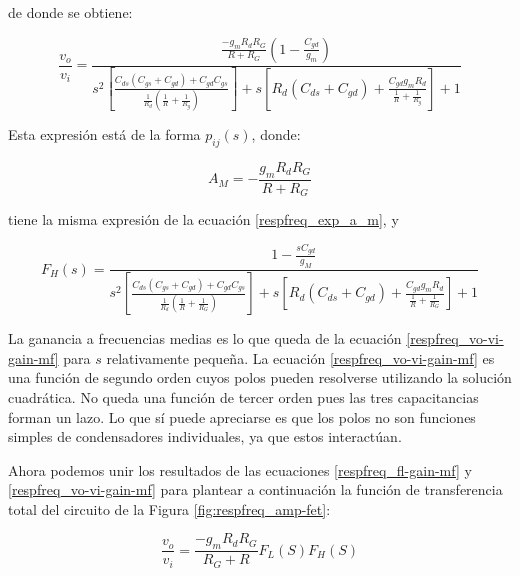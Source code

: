 de donde se obtiene:


\begin{equation} \label{respfreq_vo-vi-gain-mf}
	\frac{v_o}{v_i} = \frac{\frac{-g_m R_d R_G}{R+R_G} \left(1-\frac{C_{gd}}{g_m} \right) }{ s^2 \left[ \frac{C_{ds}\left(C_{gs}+C_{gd}\right)+C_{gd}C_{gs}}{\frac{1}{R_d}\left(\frac{1}{R}+\frac{1}{R_g} \right)}\right]+s\left[R_d\left(C_{ds}+C_{gd}\right)+\frac{C_{gd}g_{m}R_d}{\frac{1}{R}+\frac{1}{R_g}} \right] + 1}
\end{equation}

Esta expresión está de la forma \(p_{ij}(s)\), donde:

\[
A_{M} = -\frac{g_m R_d R_G}{R + R_G}
\]

tiene la misma expresión de la ecuación \ref{respfreq_exp_a_m}, y

\begin{equation} \label{respfreq_funcion-transferencia}
	F_H(s) = \frac{1 - \frac{sC_{gd}}{g_M}}{s^2 \left[ \frac{C_{ds}\left(C_{gs}+C_{gd}\right)+C_{gd}C_{gs}}{\frac{1}{R_d}\left(\frac{1}{R}+\frac{1}{R_G}\right)} \right] + s\left[ R_d\left(C_{ds}+C_{gd}\right)+\frac{C_{gd}g_{m}R_{d}}{\frac{1}{R}+\frac{1}{R_{G}}} \right] + 1}
\end{equation}

La ganancia a frecuencias medias es lo que queda de la ecuación \ref{respfreq_vo-vi-gain-mf} para \(s\) relativamente pequeña. La ecuación \ref{respfreq_vo-vi-gain-mf} es una función de segundo orden cuyos polos pueden resolverse utilizando la solución cuadrática. No queda una función de tercer orden pues las tres capacitancias forman un lazo. Lo que sí puede apreciarse es que los polos no son funciones simples de condensadores individuales, ya que estos interactúan.

Ahora podemos unir los resultados de las ecuaciones \ref{respfreq_fl-gain-mf} y \ref{respfreq_vo-vi-gain-mf} para plantear a continuación la función de transferencia total del circuito de la Figura \ref{fig:respfreq_amp-fet}:

\begin{equation}
	\frac{v_o}{v_i}= \frac{-g_m R_d R_G}{R_G + R} F_{L}(S) F_{H} (S)
\end{equation}

